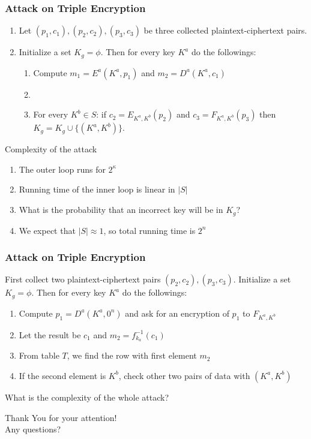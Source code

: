 \documentclass{cubeamer}
\begin{document}
\begin{frame}
	\frametitle{Attack on Triple Encryption}
	\begin{enumerate}
		\item Let $(p_1,c_1),(p_2,c_2),(p_3,c_3)$ be three collected plaintext-ciphertext pairs.
		\item Initialize a set $K_{g} = \phi$. Then for every key $K^a$ do the followings:
		\begin{enumerate}
			\item Compute $m_1 = E^a(K^a, p_1)$ and $m_2 = D^a(K^a, c_1)$
            \pause
            \item {}
            \pause
			\item For every $K^b \in S$: if $c_2 = E_{K^a, K^b}(p_2)$ and $c_3 = F_{K^a, K^b}(p_3)$ then $K_g = K_g \cup \{(K^a,K^b)\}$.
		\end{enumerate}
	\end{enumerate}
    \pause
    \begin{block}{Complexity of the attack}
        \begin{enumerate}
		    \item The outer loop runs for $2^{\kappa}$
            \item Running time of the inner loop is linear in $|S|$
            \pause
            \item What is the probability that an incorrect key will be in $K_g$?
		    \item We expect that $|S| \approx 1$, so total running time is $2^n$
        \end{enumerate}
    \end{block}
\end{frame}

\begin{frame}
	\frametitle{Attack on Triple Encryption}
\pause
	First collect two plaintext-ciphertext pairs $(p_2,c_2),(p_3,c_3)$.
	Initialize a set $K_{g} = \phi$. Then for every key $K^a$ do the followings:
    \pause
	\begin{enumerate}
		\item Compute $p_1 = D^a(K^a, 0^n)$ and ask for an encryption of $p_1$ to $F_{K^a, K^b}$
		\item Let the result be $c_1$ and $m_2 = f^{-1}_{k_a}(c_1)$
        \pause
		\item From table $T$, we find the row with first element $m_2$
		\item If the second element is $K^b$, check other two pairs of data with $(K^a, K^b)$
	\end{enumerate}
{\color{red} What is the complexity of the whole attack?}
\end{frame}

\begin{frame}
    \begin{center}
        {\huge {\color{red} Thank You} for your attention!} \\ \Large Any questions?
    \end{center}
\end{frame}



\end{document}

